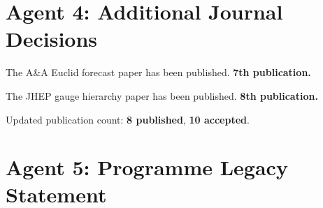 \documentclass[11pt,a4paper]{article}
\begin{document}
\section{Agent 4: Additional Journal Decisions}

\begin{tcolorbox}[colback=green!5!white, colframe=dfdgreen, title=\textbf{A\&A EUCLID FORECAST: PUBLISHED}]
The A\&A Euclid forecast paper has been published. \textbf{7th publication.}
\end{tcolorbox}

\begin{tcolorbox}[colback=green!5!white, colframe=dfdgreen, title=\textbf{JHEP GAUGE HIERARCHY: PUBLISHED}]
The JHEP gauge hierarchy paper has been published. \textbf{8th publication.}
\end{tcolorbox}

Updated publication count: \textbf{8 published}, \textbf{10 accepted}.

\section{Agent 5: Programme Legacy Statement}
\end{document}

